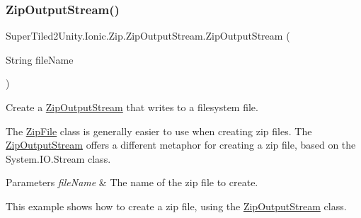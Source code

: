 \subsubsection{\texorpdfstring{Zip\+Output\+Stream()}{ZipOutputStream()}\hspace{0.1cm}{\footnotesize\ttfamily [2/3]}}
{\footnotesize\ttfamily Super\+Tiled2\+Unity.\+Ionic.\+Zip.\+Zip\+Output\+Stream.\+Zip\+Output\+Stream (\begin{DoxyParamCaption}\item[{String}]{file\+Name }\end{DoxyParamCaption})}



Create a \mbox{\hyperlink{class_super_tiled2_unity_1_1_ionic_1_1_zip_1_1_zip_output_stream}{Zip\+Output\+Stream}} that writes to a filesystem file. 

The \mbox{\hyperlink{class_super_tiled2_unity_1_1_ionic_1_1_zip_1_1_zip_file}{Zip\+File}} class is generally easier to use when creating zip files. The \mbox{\hyperlink{class_super_tiled2_unity_1_1_ionic_1_1_zip_1_1_zip_output_stream}{Zip\+Output\+Stream}} offers a different metaphor for creating a zip file, based on the System.\+I\+O.\+Stream class. 


\begin{DoxyParams}{Parameters}
{\em file\+Name} & The name of the zip file to create. \\
\hline
\end{DoxyParams}


This example shows how to create a zip file, using the \mbox{\hyperlink{class_super_tiled2_unity_1_1_ionic_1_1_zip_1_1_zip_output_stream}{Zip\+Output\+Stream}} class.


